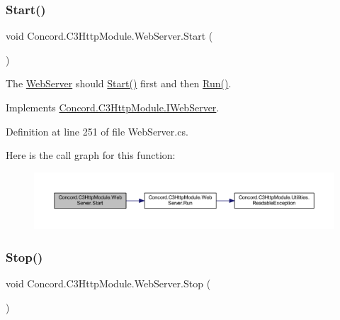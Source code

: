 \subsubsection{\texorpdfstring{Start()}{Start()}}
{\footnotesize\ttfamily void Concord.\+C3\+Http\+Module.\+Web\+Server.\+Start (\begin{DoxyParamCaption}{ }\end{DoxyParamCaption})\hspace{0.3cm}{\ttfamily [inline]}}



The \mbox{\hyperlink{class_concord_1_1_c3_http_module_1_1_web_server}{Web\+Server}} should \mbox{\hyperlink{class_concord_1_1_c3_http_module_1_1_web_server_ac95e30c39f5d922e6043377ccac20e6d}{Start()}} first and then \mbox{\hyperlink{class_concord_1_1_c3_http_module_1_1_web_server_a25053b2c9397975cf48565d98b9c2d9e}{Run()}}. 



Implements \mbox{\hyperlink{interface_concord_1_1_c3_http_module_1_1_i_web_server_a9f361fa34fa5c93d792e32a3ce8969cf}{Concord.\+C3\+Http\+Module.\+I\+Web\+Server}}.



Definition at line 251 of file Web\+Server.\+cs.

Here is the call graph for this function\+:
\nopagebreak
\begin{figure}[H]
\begin{center}
\leavevmode
\includegraphics[width=350pt]{class_concord_1_1_c3_http_module_1_1_web_server_ac95e30c39f5d922e6043377ccac20e6d_cgraph}
\end{center}
\end{figure}
\mbox{\label{class_concord_1_1_c3_http_module_1_1_web_server_a9e75b9b9d1eb2c58a1be558bf9182087}} 
\subsubsection{\texorpdfstring{Stop()}{Stop()}}
{\footnotesize\ttfamily void Concord.\+C3\+Http\+Module.\+Web\+Server.\+Stop (\begin{DoxyParamCaption}{ }\end{DoxyParamCaption})\hspace{0.3cm}{\ttfamily [inline]}}



